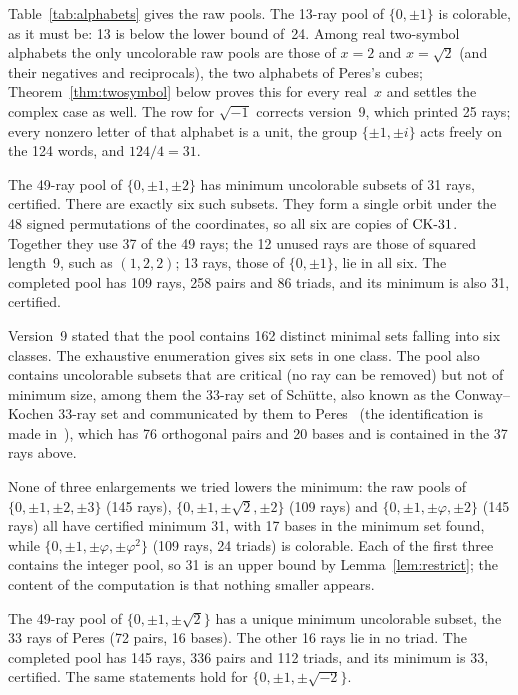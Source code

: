 Table~\ref{tab:alphabets} gives the raw pools.  The 13-ray pool of $\{0,\pm1\}$ is colorable, as
it must be: 13 is below the lower bound of~24.  Among real two-symbol alphabets the
only uncolorable raw pools are those of $x=2$ and $x=\sqrt2$ (and their negatives and
reciprocals), the two alphabets of Peres's cubes; Theorem~\ref{thm:twosymbol} below proves this
for every real~$x$ and settles the complex case as well.
The row for $\sqrt{-1}$ corrects version~9, which printed 25 rays; every nonzero letter of that
alphabet is a unit, the group $\{\pm1,\pm i\}$ acts freely on the 124 words, and $124/4=31$.

\begin{fact}\label{fact:integer}
The 49-ray pool of $\{0,\pm1,\pm2\}$ has minimum uncolorable subsets of 31 rays, certified.  There
are exactly six such subsets.  They form a single orbit under the 48 signed permutations of the
coordinates, so all six are copies of $\mathrm{CK}\text{-}31$.  Together they use 37 of the 49 rays; the 12 unused
rays are those of squared length~9, such as $(1,2,2)$; 13 rays, those of $\{0,\pm1\}$, lie in all
six.  The completed pool has 109 rays, 258 pairs and 86 triads, and its minimum is also 31,
certified.
\end{fact}

Version~9 stated that the pool contains 162 distinct minimal sets falling into six classes.  The
exhaustive enumeration gives six sets in one class.  The pool also contains uncolorable subsets
that are critical (no ray can be removed) but not of minimum size, among them the 33-ray set
of Sch\"utte, also known as the Conway--Kochen 33-ray set and communicated by them to
Peres~\cite{Peres1991} (the identification is made in~\cite{TrandafirCabello2025}), which has 76
orthogonal pairs and
20 bases and is contained in the 37 rays above.

None of three enlargements we tried lowers the minimum: the raw pools of $\{0,\pm1,\pm2,\pm3\}$ (145 rays),
$\{0,\pm1,\pm\sqrt2,\pm2\}$ (109 rays) and $\{0,\pm1,\pm\varphi,\pm2\}$ (145 rays) all have
certified minimum 31, with 17 bases in the minimum set found, while
$\{0,\pm1,\pm\varphi,\pm\varphi^2\}$ (109 rays, 24 triads) is colorable.  Each of the first three
contains the integer pool, so 31 is an upper bound by Lemma~\ref{lem:restrict}; the content of
the computation is that nothing smaller appears.

\begin{fact}\label{fact:peres}
The 49-ray pool of $\{0,\pm1,\pm\sqrt2\}$ has a unique minimum uncolorable subset, the 33 rays of
Peres (72 pairs, 16 bases).  The other 16 rays lie in no triad.  The completed pool has 145 rays,
336 pairs and 112 triads, and its minimum is 33, certified.  The same statements hold for
$\{0,\pm1,\pm\sqrt{-2}\}$.
\end{fact}

